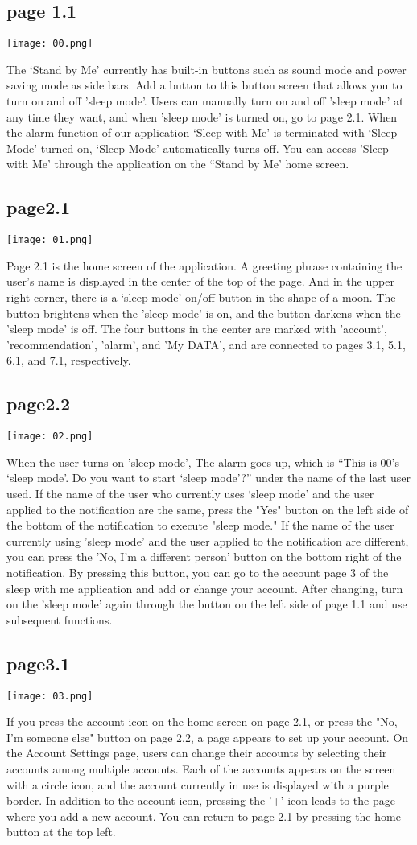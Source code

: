 \documentclass[conference]{IEEEtran}
\begin{document}
\subsection{page 1.1}
\centerline{\texttt{[image: 00.png]}}
The ‘Stand by Me’ currently has built-in buttons such as sound mode and power saving mode as side bars. Add a button to this button screen that allows you to turn on and off 'sleep mode'. Users can manually turn on and off 'sleep mode' at any time they want, and when 'sleep mode' is turned on, go to page 2.1. When the alarm function of our application ‘Sleep with Me’ is terminated with ‘Sleep Mode’ turned on, ‘Sleep Mode’ automatically turns off. You can access 'Sleep with Me' through the application on the “Stand by Me’ home screen.
\subsection{page2.1}
\centerline{\texttt{[image: 01.png]}}
Page 2.1 is the home screen of the application. A greeting phrase containing the user's name is displayed in the center of the top of the page. And in the upper right corner, there is a ‘sleep mode’ on/off button in the shape of a moon. The button brightens when the 'sleep mode' is on, and the button darkens when the 'sleep mode' is off. The four buttons in the center are marked with 'account', 'recommendation', 'alarm', and 'My DATA', and are connected to pages 3.1, 5.1, 6.1, and 7.1, respectively.
\subsection{page2.2}
\centerline{\texttt{[image: 02.png]}}
When the user turns on 'sleep mode', The alarm goes up, which is “This is 00's ‘sleep mode’. Do you want to start ‘sleep mode’?” under the name of the last user used. If the name of the user who currently uses ‘sleep mode’ and the user applied to the notification are the same, press the "Yes" button on the left side of the bottom of the notification to execute "sleep mode." If the name of the user currently using 'sleep mode' and the user applied to the notification are different, you can press the 'No, I'm a different person' button on the bottom right of the notification. By pressing this button, you can go to the account page 3 of the sleep with me application and add or change your account. After changing, turn on the 'sleep mode' again through the button on the left side of page 1.1 and use subsequent functions.
\subsection{page3.1}
\centerline{\texttt{[image: 03.png]}}
If you press the account icon on the home screen on page 2.1, or press the "No, I'm someone else" button on page 2.2, a page appears to set up your account. On the Account Settings page, users can change their accounts by selecting their accounts among multiple accounts. Each of the accounts appears on the screen with a circle icon, and the account currently in use is displayed with a purple border. In addition to the account icon, pressing the '+' icon leads to the page where you add a new account. You can return to page 2.1 by pressing the home button at the top left.
\end{document}
